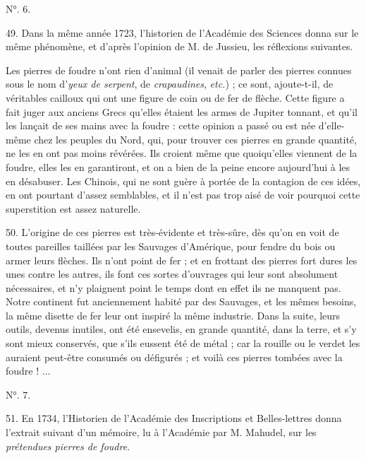 \documentclass[a4paper, 11pt, oneside, polutonikogreek, french]{article}
\begin{document}
\begin{center}
N°. 6.
\end{center}

49. Dans la même année 1723, l'historien de l'Académie des Sciences donna sur le même phénomène, et d'après l'opinion de M. de Jussieu, les réflexions suivantes.

\og Les pierres de foudre n'ont rien d'animal (il venait de parler des pierres connues sous le nom d'\emph{yeux de serpent}, de \emph{crapaudines}, \emph{etc.}) ; ce sont, ajoute-t-il, de véritables cailloux qui ont une figure de coin ou de fer de flèche. Cette figure a fait juger aux anciens Grecs qu'elles étaient les armes de Jupiter tonnant, et qu'il les lançait de ses mains avec la foudre : cette opinion a passé ou est née d'elle-même chez les peuples du Nord, qui, pour trouver ces pierres en grande quantité, ne les en ont pas moins révérées. Ils croient même que quoiqu'elles viennent de la foudre, elles les en garantiront, et on a bien de la peine encore aujourd'hui à les en désabuser. Les Chinois, qui ne sont guère à portée de la contagion de ces idées, en ont pourtant d'assez semblables, et il n'est pas trop aisé de voir pourquoi cette superstition est assez naturelle. \fg

50. L'origine de ces pierres est très-évidente et très-sûre, dès qu'on en voit de toutes pareilles taillées par les Sauvages d'Amérique, pour fendre du bois ou armer leurs flèches. Ils n'ont point de fer ; et en frottant des pierres fort dures les unes contre les autres, ils font ces sortes d'ouvrages qui leur sont absolument nécessaires, et n'y plaignent point le temps dont en effet ils ne manquent pas. Notre continent fut anciennement habité par des Sauvages, et les mêmes besoins, la même disette de fer leur ont inspiré la même industrie. Dans la suite, leurs outils, devenus inutiles, ont été ensevelis, en grande quantité, dans la terre, et s'y sont mieux conservés, que s'ils eussent été de métal ; car la rouille ou le verdet les auraient peut-être consumés ou défigurés ; et voilà ces pierres tombées avec la foudre ! ...

\begin{center}
N°. 7.
\end{center}

51. En 1734, l'Historien de l'Académie des Inscriptions et Belles-lettres donna l'extrait suivant d'un mémoire, lu à l'Académie par M. Mahudel, sur les \emph{prétendues pierres de foudre}.
\end{document}

